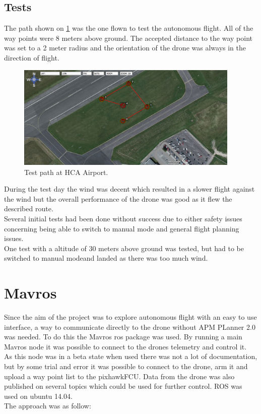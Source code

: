  
\subsection{Tests}
The path shown on \ref{fig:HCAPath} was the one flown to test the autonomous flight. All of the way
points were 8 meters above ground. The accepted distance to the way point was set to a 2 meter
radius and the orientation of the drone was always in the direction of flight.

\begin{figure}[H]
  \centering
    \includegraphics[width=0.95\textwidth]{./Images/HCAPath}
  \caption{Test path at HCA Airport.}
  \label{fig:HCAPath}
\end{figure}

During the test day the wind was decent which resulted in a slower flight against the wind but the
overall performance of the drone was good as it flew the described route. \\

Several initial tests had been done without success due to either safety issues concerning being
able to switch to manual mode and general flight planning issues.\\

One test with a altitude of 30 meters above ground was tested, but had to be switched to manual
modeand landed as there was too much wind.\\
 
\section{Mavros}
Since the aim of the project was to explore autonomous flight with an easy to use interface, a way
to communicate directly to the drone without APM PLanner 2.0 was needed. To do this the Mavros
\cite{Ref:Mavros} ros package was used. By running a main Mavros node it was possible to connect to
the drones telemetry and control it.\\
As this node was in a beta state when used there was not a lot of documentation, but by some trial
and error it was possible to connect to the drone, arm it and upload a way point list to the
pixhawkFCU. Data from the drone was also published on several topics which could be used for further
control. ROS was used on ubuntu 14.04.\\
The approach was as follow:

